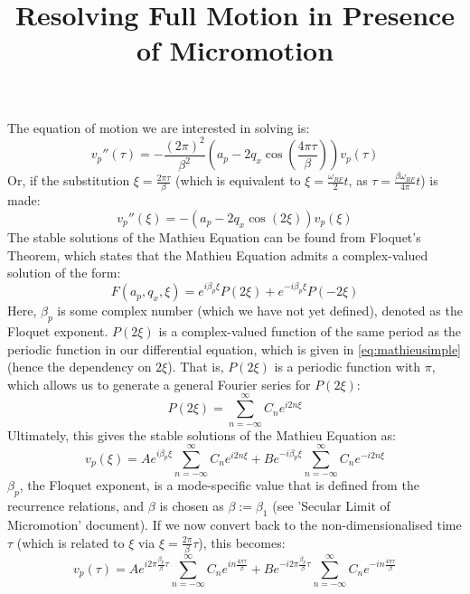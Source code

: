 \documentclass{article}
\title{Resolving Full Motion in Presence of Micromotion}
\begin{document}
\maketitle

\noindent The equation of motion we are interested in solving is:
\begin{equation}
v_p''(\tau) = - \frac{(2 \pi)^2}{\beta^2} \left( a_p - 2 q_x \cos \left( \frac{4 \pi \tau}{\beta} \right) \right) v_p (\tau)	
\label{eq:mathieu}
\end{equation}
Or, if the substitution $\xi = \frac{2 \pi \tau}{\beta}$ (which is equivalent to $\xi = \frac{\omega_{RF}}{2} t$, as $\tau = \frac{\beta \omega_{RF}}{4 \pi} t$) is made:
\begin{equation}
v_p''(\xi)	= - \left( a_p - 2 q_x \cos \left( 2 \xi \right) \right) v_p (\xi)
\label{eq:mathieusimple}
\end{equation}
The stable solutions of the Mathieu Equation can be found from Floquet's Theorem, which states that the Mathieu Equation admits a complex-valued solution of the form:
\begin{equation}
F(a_p ,q_x,\xi) = e^{i \beta_p \xi} P (2 \xi) + e^{-i \beta_p \xi} P(-2 \xi)
\end{equation}
Here, $\beta_p$ is some complex number (which we have not yet defined), denoted as the Floquet exponent. $P (2 \xi)$ is a complex-valued function of the same period as the periodic function in our differential equation, which is given in \eqref{eq:mathieusimple} (hence the dependency on $2 \xi$). That is, $P (2 \xi)$ is a periodic function with $\pi$, which allows us to generate a general Fourier series for $P (2 \xi)$:
\begin{equation}
P (2 \xi) = \sum_{n = - \infty}^{\infty} C_n e^{i 2 n \xi}	
\end{equation}
Ultimately, this gives the stable solutions of the Mathieu Equation as:
\begin{equation}
	v_p (\xi) = A e^{i \beta_p \xi} \sum_{n = - \infty}^{\infty} C_{n} e^{i 2 n \xi} + B e^{- i \beta_p \xi} \sum_{n = - \infty}^{\infty} C_{n} e^{- i 2 n \xi}
	\label{eq:motion}
\end{equation}
$\beta_p$, the Floquet exponent, is a mode-specific value that is defined from the recurrence relations, and $\beta$ is chosen as $\beta := \beta_1$ (see 'Secular Limit of Micromotion' document). If we now convert back to the non-dimensionalised time $\tau$ (which is related to $\xi$ via $\xi = \frac{2 \pi}{\beta} \tau$), this becomes:
\begin{equation}
	v_p (\tau) = A e^{i 2 \pi \frac{\beta_p}{\beta} \tau} \sum_{n = - \infty}^{\infty} C_{n} e^{i n \frac{4 \pi \tau}{\beta}} + B e^{- i 2 \pi \frac{\beta_p}{\beta} \tau} \sum_{n = - \infty}^{\infty} C_{n} e^{- i n \frac{4 \pi \tau}{\beta}}
	\label{eq:motion2}
\end{equation}
\end{document}
